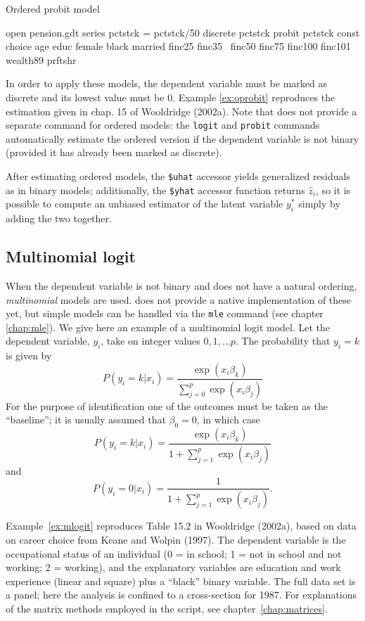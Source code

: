 \begin{script}[htbp]
  \caption{Ordered probit model}
  \label{ex:oprobit}
\begin{scode}
open pension.gdt
series pctstck = pctstck/50
discrete pctstck
probit pctstck const choice age educ female black married finc25 finc35 \
  finc50 finc75 finc100 finc101 wealth89 prftshr
\end{scode}
\end{script}

In order to apply these models, the dependent variable must be marked
as discrete and its lowest value must be 0. Example \ref{ex:oprobit}
reproduces the estimation given in chap. 15 of Wooldridge (2002a). Note
that \app{gretl} does not provide a separate command for ordered
models: the \texttt{logit} and \texttt{probit} commands automatically
estimate the ordered version if the dependent variable is not binary
(provided it has already been marked as discrete).

After estimating ordered models, the \verb+$uhat+ accessor yields
generalized residuals as in binary models; additionally, the
\verb+$yhat+ accessor function returns $\hat{z}_i$, so it is
possible to compute an unbiased estimator of the latent variable
$y^*_i$ simply by adding the two together.

\subsection{Multinomial logit}
\label{sec:mlogit}

When the dependent variable is not binary and does not have a natural
ordering, \emph{multinomial} models are used. \app{Gretl} does not
provide a native implementation of these yet, but simple models can be
handled via the \texttt{mle} command (see chapter \ref{chap:mle}). We
give here an example of a multinomial logit model.  Let the dependent
variable, $y_i$, take on integer values $0,1,\dots p$.  The
probability that $y_i = k$ is given by
\[
  P(y_i = k |  x_i) = \frac{\exp(x_i \beta_k)}{\sum_{j=0}^p \exp(x_i \beta_j)}
\]
For the purpose of identification one of the outcomes must be taken as
the ``baseline''; it is usually assumed that $\beta_0 = 0$, in which case
\[
  P(y_i = k |  x_i) = \frac{\exp(x_i \beta_k)}{1 + \sum_{j=1}^p \exp(x_i \beta_j)} 
\]
and
\[
  P(y_i = 0 |  x_i) = \frac{1}{1 + \sum_{j=1}^p \exp(x_i \beta_j)} .
\]

Example~\ref{ex:mlogit} reproduces Table 15.2 in Wooldridge (2002a),
based on data on career choice from Keane and Wolpin (1997).  The
dependent variable is the occupational status of an individual (0 = in
school; 1 = not in school and not working; 2 = working), and the
explanatory variables are education and work experience (linear and
square) plus a ``black'' binary variable.  The full data set is a
panel; here the analysis is confined to a cross-section for 1987.  For
explanations of the matrix methods employed in the script, see
chapter~\ref{chap:matrices}.

